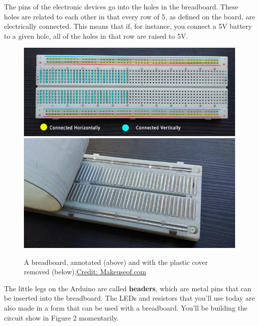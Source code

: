 \documentclass[12pt]{article}
\begin{document}
The pins of the electronic devices go into the holes in the
breadboard. These holes are related to each other in that every row of
5, as defined on the board, are electrically connected. This means
that if, for instance, you connect a 5V battery to a given hole, all
of the holes in that row are raised to 5V.

\begin{figure}[h!]
   \begin{center}
     \includegraphics[width=\linewidth]{Figures/breadboard_annotated_670-1.jpg}
     \includegraphics[width=\linewidth]{Figures/breadboard_back_peel_670.jpg}
     \caption{A breadboard, annotated (above) and with the plastic cover removed (below).\newline  \href{https://www.makeuseof.com/tag/what-is-breadboard/}{Credit: Makeuseof.com}}
   \end{center}
\end{figure}
    	
The little legs on the Arduino are called \textbf{headers}, which are
metal pins that can be inserted into the breadboard. The LEDs and
resistors that you’ll use today are also made in a form that can be
used with a breadboard. You'll be building the circuit show in Figure
2 momentarily. \newline
    	
\end{document}
